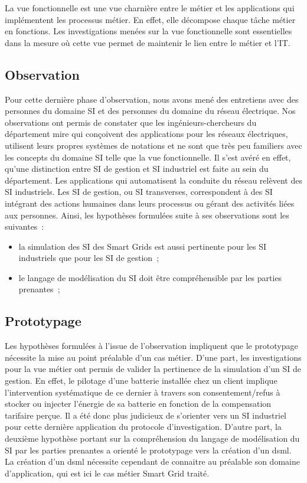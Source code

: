 La vue fonctionnelle est une vue charnière entre le métier et les applications qui  implémentent les processus métier. En effet, elle décompose chaque tâche métier en fonctions. Les investigations menées sur la vue fonctionnelle sont essentielles dans la mesure où cette vue permet de maintenir le lien entre le métier et l'IT. 

\subsection{Observation}
Pour cette dernière phase d'observation, nous avons mené des entretiens avec des personnes du domaine SI et des personnes du domaine du réseau électrique. Nos observations ont permis de constater que les ingénieurs-chercheurs du département \gls{mire} qui conçoivent des applications pour les réseaux électriques, utilisent leurs propres systèmes de notations et ne sont que très peu familiers avec les concepts du domaine SI telle que la vue fonctionnelle. Il s'est avéré en effet, qu'une distinction entre SI de gestion et SI industriel est faite au sein du département. Les applications qui automatisent la conduite du réseau relèvent des SI industriels. Les SI de gestion, ou SI transverses, correspondent à des SI intégrant des actions humaines dans leurs processus ou gérant des activités liées aux personnes.
Ainsi, les hypothèses formulées suite à ses observations sont les suivantes~:
\begin{itemize}
    \item la simulation des SI des Smart Grids est aussi pertinente pour les SI industriels que pour les SI de gestion~;
	\item le langage de modélisation du SI doit être compréhensible par les parties prenantes~;
\end{itemize}	 

\subsection{Prototypage}
Les hypothèses formulées à l'issue de l'observation impliquent que le prototypage nécessite la mise au point préalable d'un cas métier. D'une part, les investigations pour la vue métier ont permis de valider la pertinence de la simulation d'un SI de gestion. En effet, le pilotage d'une batterie installée chez un client implique l'intervention systématique de ce dernier à travers son consentement/refus à stocker ou injecter l'énergie de sa batterie en fonction de la compensation tarifaire perçue. Il a été donc plus judicieux de s'orienter vers un SI industriel pour cette dernière application du protocole  d'investigation. D'autre part, la deuxième hypothèse portant sur la compréhension du langage de modélisation du SI par les parties prenantes a orienté le prototypage vers la création d'un \gls{dsml}. La création d'un \gls{dsml} nécessite cependant de connaitre au préalable son domaine d'application, qui est ici le cas métier Smart Grid traité. 

